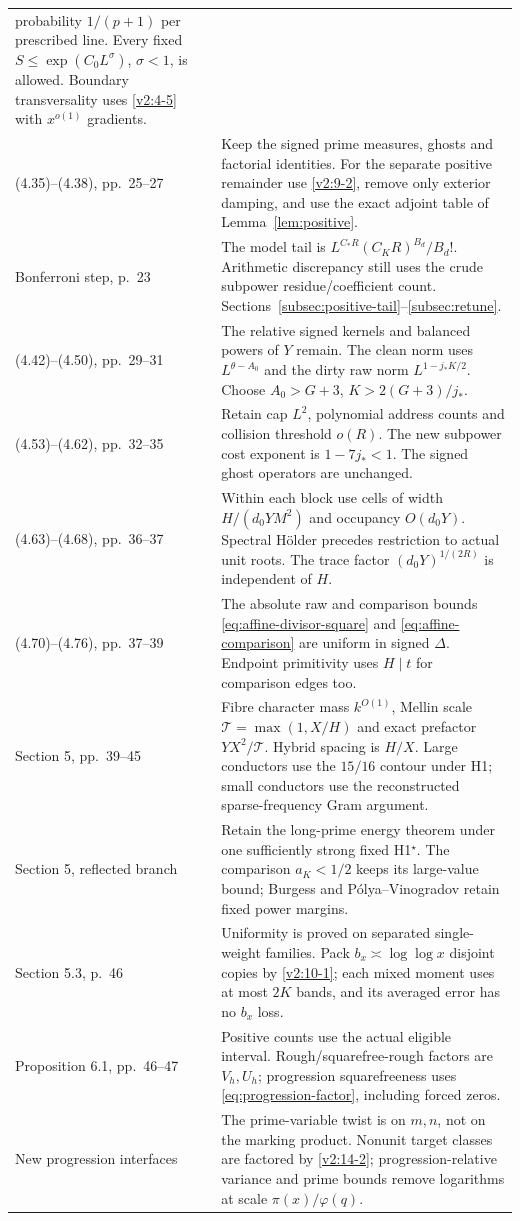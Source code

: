 \documentclass[11pt]{article}
\theoremstyle{definition}
\theoremstyle{remark}
\numberwithin{equation}{section}
\begin{document}
\begin{longtable}{@{}>{\raggedright\arraybackslash}p{}>{\raggedright\arraybackslash}p{}@{}}
probability $1/(p+1)$ per prescribed line. Every fixed
$S\le\exp(C_0L^\sigma)$, $\sigma<1$, is allowed. Boundary
transversality uses \eqref{v2:4-5} with $x^{o(1)}$ gradients.\\
(4.35)--(4.38), pp.~25--27 & Keep the signed prime measures,
ghosts and factorial identities. For the separate positive
remainder use \eqref{v2:9-2}, remove only exterior damping,
and use the exact adjoint table of Lemma~\ref{lem:positive}.\\
Bonferroni step, p.~23 & The model tail is
$L^{C_*R}(C_KR)^{B_d}/B_d!$. Arithmetic discrepancy still
uses the crude subpower residue/coefficient count.
Sections~\ref{subsec:positive-tail}--\ref{subsec:retune}.\\
(4.42)--(4.50), pp.~29--31 & The relative signed kernels and
balanced powers of $Y$ remain. The clean norm uses
$L^{\theta-A_0}$ and the dirty raw norm $L^{1-j_*K/2}$.
Choose $A_0>G+3$, $K>2(G+3)/j_*$.\\
(4.53)--(4.62), pp.~32--35 & Retain cap $L^2$, polynomial
address counts and collision threshold $o(R)$. The new
subpower cost exponent is $1-7j_*<1$.
The signed ghost operators are unchanged.\\
(4.63)--(4.68), pp.~36--37 & Within each block use cells of
width $H/(d_0YM^2)$ and occupancy $O(d_0Y)$. Spectral
H\"older precedes restriction to actual unit roots. The trace
factor $(d_0Y)^{1/(2R)}$ is independent of $H$.\\
(4.70)--(4.76), pp.~37--39 & The absolute raw and comparison
bounds \eqref{eq:affine-divisor-square} and
\eqref{eq:affine-comparison} are uniform in signed $\Delta$.
Endpoint primitivity uses $H\mid t$ for comparison edges too.\\
Section 5, pp.~39--45 & Fibre character mass $k^{O(1)}$,
Mellin scale $\mathcal T=\max(1,X/H)$ and exact prefactor
$YX^2/\mathcal T$. Hybrid spacing is $H/X$. Large conductors
use the $15/16$ contour under H1; small conductors use the
reconstructed sparse-frequency Gram argument.\\
Section 5, reflected branch & Retain the long-prime energy
theorem under one sufficiently strong fixed H1$^\star$.
The comparison $a_K<1/2$ keeps its large-value bound; Burgess
and P\'olya--Vinogradov retain fixed power margins.\\
Section 5.3, p.~46 & Uniformity is proved on separated
single-weight families. Pack $b_x\asymp\log\log x$ disjoint
copies by \eqref{v2:10-1}; each mixed moment uses at most
$2K$ bands, and its averaged error has no $b_x$ loss.\\
Proposition 6.1, pp.~46--47 & Positive counts use the actual
eligible interval. Rough/squarefree-rough factors are $V_h,U_h$;
progression squarefreeness uses \eqref{eq:progression-factor},
including forced zeros.\\
New progression interfaces & The prime-variable twist is on
$m,n$, not on the marking product. Nonunit target classes are
factored by \eqref{v2:14-2}; progression-relative variance and
prime bounds remove logarithms at scale $\pi(x)/\varphi(q)$.\\
\bottomrule
\end{longtable}
\end{document}
